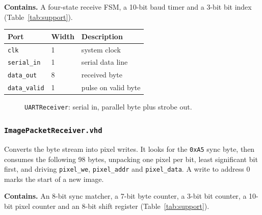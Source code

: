 \documentclass[11pt,a4paper]{article}
\begin{document}
\textbf{Contains.} A four-state receive FSM, a 10-bit baud timer and a 3-bit bit
index (Table~\ref{tab:support}).

\begin{center}
\small
\begin{tabularx}{\linewidth}{@{}llL@{}}
\toprule
\textbf{Port} & \textbf{Width} & \textbf{Description} \\
\midrule
\texttt{clk}        & 1  & system clock \\
\texttt{serial\_in} & 1  & serial data line \\
\texttt{data\_out}  & 8  & received byte \\
\texttt{data\_valid}& 1  & pulse on valid byte \\
\bottomrule
\end{tabularx}
\end{center}

\begin{figure}[H]
\centering
{}
\caption{\texttt{UARTReceiver}: serial in, parallel byte plus strobe out.}
\label{fig:uart}
\end{figure}

\subsubsection{\texttt{ImagePacketReceiver.vhd}}
\label{sub:pkt}

Converts the byte stream into pixel writes. It looks for the \texttt{0xA5} sync
byte, then consumes the following 98 bytes, unpacking one pixel per bit, least
significant bit first, and driving \texttt{pixel\_we}, \texttt{pixel\_addr} and
\texttt{pixel\_data}. A write to address 0 marks the start of a new image.

\textbf{Contains.} An 8-bit sync matcher, a 7-bit byte counter, a 3-bit bit
counter, a 10-bit pixel counter and an 8-bit shift register
(Table~\ref{tab:support}).
\end{document}
